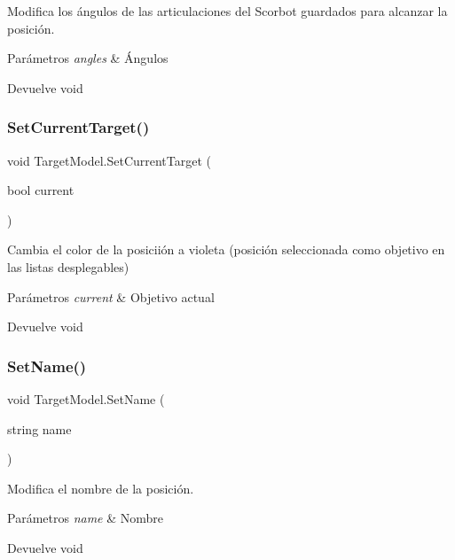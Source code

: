 Modifica los ángulos de las articulaciones del Scorbot guardados para alcanzar la posición. 
\begin{DoxyParams}{Parámetros}
{\em angles} & Ángulos \\
\hline
\end{DoxyParams}
\begin{DoxyReturn}{Devuelve}
void 
\end{DoxyReturn}
\mbox{\label{class_target_model_a1f82c9cde211b28154e072c7873994d9}} 
\subsubsection{\texorpdfstring{SetCurrentTarget()}{SetCurrentTarget()}}
{\footnotesize\ttfamily void Target\+Model.\+Set\+Current\+Target (\begin{DoxyParamCaption}\item[{bool}]{current }\end{DoxyParamCaption})\hspace{0.3cm}{\ttfamily [inline]}}

Cambia el color de la posiciión a violeta (posición seleccionada como objetivo en las listas desplegables) 
\begin{DoxyParams}{Parámetros}
{\em current} & Objetivo actual \\
\hline
\end{DoxyParams}
\begin{DoxyReturn}{Devuelve}
void 
\end{DoxyReturn}
\mbox{\label{class_target_model_a056e89cd27d78b4d7d024d8bc4d0d3cd}} 
\subsubsection{\texorpdfstring{SetName()}{SetName()}}
{\footnotesize\ttfamily void Target\+Model.\+Set\+Name (\begin{DoxyParamCaption}\item[{string}]{name }\end{DoxyParamCaption})\hspace{0.3cm}{\ttfamily [inline]}}

Modifica el nombre de la posición. 
\begin{DoxyParams}{Parámetros}
{\em name} & Nombre \\
\hline
\end{DoxyParams}
\begin{DoxyReturn}{Devuelve}
void 
\end{DoxyReturn}
\mbox{\label{class_target_model_a6f7401c43a6ba1c0f7204dcf66efbed5}} 
